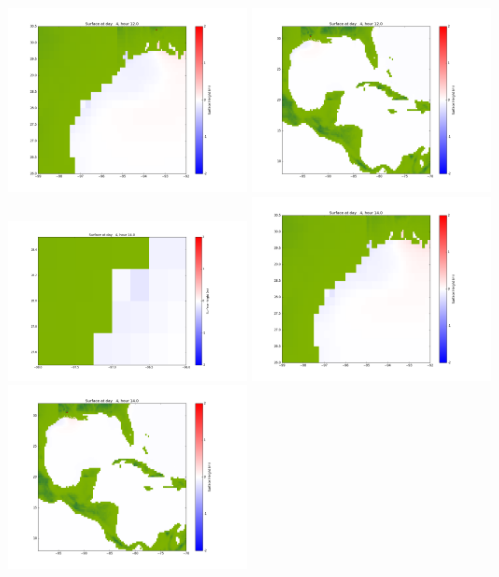 \documentclass[11pt]{article}
\begin{document}
\includegraphics[width=0.475\textwidth]{frame0078fig1002.png}
\vskip 10pt 
\includegraphics[width=0.475\textwidth]{frame0078fig1003.png}
\vskip 10pt 
\includegraphics[width=0.475\textwidth]{frame0079fig1001.png}
\includegraphics[width=0.475\textwidth]{frame0079fig1002.png}
\vskip 10pt 
\includegraphics[width=0.475\textwidth]{frame0079fig1003.png}
\end{document}
